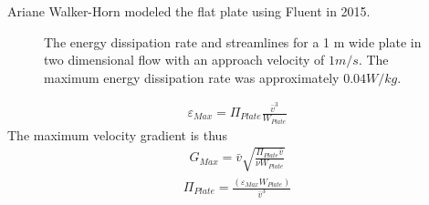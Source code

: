 \documentclass[letterpaper,10pt,english]{sphinxmanual}
\let\sphinxpxdimen\pdfpxdimen\else\newdimen\sphinxpxdimen
\begin{document}
Ariane Walker-Horn modeled the flat plate using Fluent in 2015.

\begin{figure}[htbp]
\centering
\capstart

\noindent\sphinxincludegraphics[width=600\sphinxpxdimen]{{CFD_Flat_Plate}.png}
\caption{The energy dissipation rate and streamlines for a 1 m wide plate in two dimensional flow with an approach velocity of \(1 m/s\). The maximum energy dissipation rate was approximately \(0.04 W/kg\).}\label{\detokenize{Rapid_Mix/RM_Derivations:id10}}\label{\detokenize{Rapid_Mix/RM_Derivations:figure-cfd-flat-plate}}\end{figure}
\begin{equation}\label{equation:Rapid_Mix/RM_Derivations:Rapid_Mix/RM_Derivations:132}
\begin{split}\varepsilon _{Max} = \Pi_{Plate}\frac{\bar v^3}{W_{Plate}}\end{split}
\end{equation}
The maximum velocity gradient is thus
\begin{equation}\label{equation:Rapid_Mix/RM_Derivations:Rapid_Mix/RM_Derivations:133}
\begin{split}G_{Max} = \bar v\sqrt{\frac{\Pi_{Plate} \bar v}{\nu W_{Plate}}}\end{split}
\end{equation}\begin{equation}\label{equation:Rapid_Mix/RM_Derivations:Rapid_Mix/RM_Derivations:134}
\begin{split}\Pi_{Plate} = \frac{ \left( \varepsilon_{Max} W_{Plate} \right)}{\bar v^3}\end{split}
\end{equation}
%
\begin{sphinxVerbatim}[commandchars=\\\{\}]
  
  
  
    
\end{sphinxVerbatim}
\end{document}
